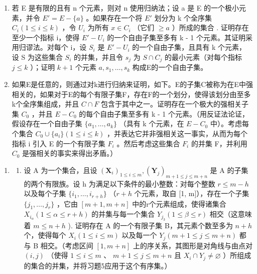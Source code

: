 \begin{enumerate}
\def\labelenumi{(\alph{enumi})}
\item
  若 E 是有限的且有 n 个元素，则对 n 使用归纳法；设 a 是 E 的一个极小元素，并令 \(E' = E - \{a\}\) 。如果存在一个将 \(E'\) 划分为 k 个全序集 \(C_i (1 \leqslant i \leqslant k)\) ，令 \(U_i\) 为所有 \(x \in C_i\) （它们 \(\geqslant a\) ）所成的集合 . 证明存在至少一个指标 i，使得 \(E' - U_i\) 的一个自由子集至多有 k - 1 个元素。其证明采用归谬法。对每个 i，设 \(S_i\) 是 \(E' - U_i\) 的一个自由子集，且具有 k 个元素，设 S 为这些集合 \(S_i\) 的并集，并且令 \(s_j\) 为 \(S \cap C_j\) 的最小元素（对每个指标 \(j \leqslant k\) ）；证明 \(k + 1\) 个元素 \(a, s_1, \ldots, s_k\) 构成E的一个自由子集。
\item
  如果E是任意的，则通过对k进行归纳来证明，如下。E的子集C被称为在E中强相关的，如果对于E的每个有限子集F，存在F的一个划分，使得该划分由至多k个全序集组成，并且 \(C \cap F\) 包含于其中之一。证明存在一个极大的强相关子集 \(C_{0}\) ，并且 \(E - C_{0}\) 的每个自由子集至多有 k - 1 个元素。（用反证法论证，假设存在一个自由子集 \(\{a_{1}, \ldots, a_{k}\}\) （具有 k 个元素，在 \(E - C_{0}\) 中）。考虑每个集合 \(C_{0} \cup \{a_{i}\} (1 \leqslant i \leqslant k)\) ，并表达它并非强相关这一事实，从而为每个指标 i 引入 E 的一个有限子集 \(F_{i}\) 。然后考虑这些集合 \(F_{i}\) 的并集 F，并利用 \(C_{0}\) 是强相关的事实来得出矛盾。）
\end{enumerate}

\begin{enumerate}
\def\labelenumi{\arabic{enumi}.}
\setcounter{enumi}{5}
\tightlist
\item
  \begin{enumerate}
  \def\labelenumii{(\alph{enumii})}
  \tightlist
  \item
    设 A 为一个集合，且设 \((\mathbf{X}_{i})_{1\leqslant i\leqslant m},(\mathbf{Y}_{j})_{m+1\leqslant j\leqslant m+n}\) 是 A 的子集的两个有限族。设 h 为满足以下条件的最小整数：对每个整数 \(r\leqslant m-h\) 以及每个子集 \(\{i_{1},\ldots,i_{r+h}\}\) （\(r+h\) 个元素，取自 {[}1, m{]}），存在一个子集 \(\{j_{1},\ldots,j_{r}\}\) ，它由 \([m+1,m+n]\) 中的r个元素组成，使得诸集合 \(X_{i_{\alpha}}(1\leqslant\alpha\leqslant r+h)\) 的并集与每一个集合 \(Y_{j_{3}}(1\leqslant\beta\leqslant r)\) 相交（这意味着 \(m\leqslant n+h\) ). 证明存在 A 的一个有限子集 B，其元素个数至多为 \(n+h\) 个，使得每个 \(X_{i}(1\leqslant i\leqslant m)\) 以及每一个 \(Y_{j}(m+1\leqslant j\leqslant m+n)\) 都与 B 相交。（考虑区间 \([1,m+n]\) 上的序关系，其图形是对角线与由点对 \((i,j)\) （使得 \(1\leqslant i\leqslant m\) 、 \(m+1\leqslant j\leqslant m+n\) 且 \(X_{i}\cap Y_{j}\neq\varnothing\) ）所组成的集合的并集，并将习题5应用于这个有序集。）
  \end{enumerate}
\end{enumerate}

